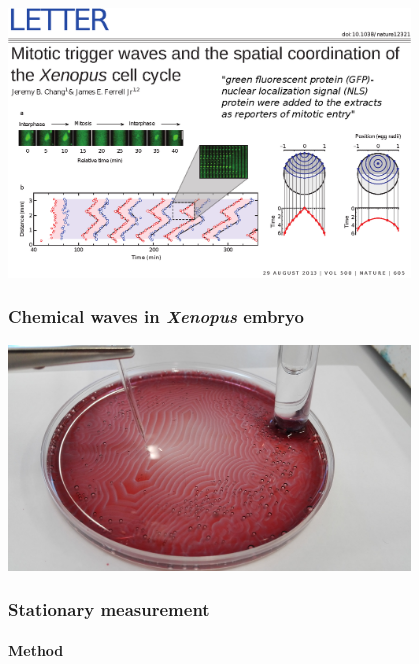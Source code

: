 \documentclass{beamer}
\begin{document}
\begin{frame}
	\centering
	\includegraphics[width=0.8\textwidth]{chang.eps}
	\frametitle{Chemical waves in \emph{Xenopus} embryo}
\end{frame}

\begin{frame}
	\centering
	\includegraphics[width=0.8\textwidth]{setup1.jpg}
	\frametitle{Stationary measurement}
	\framesubtitle{Method}
\end{frame}
\end{document}

